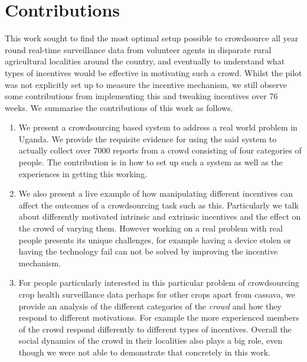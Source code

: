 \documentclass[letterpaper]{article} %
\begin{document}
\section{Contributions}
This work sought to find the most optimal setup possible to crowdsource all year round real-time surveillance data from volunteer agents in disparate rural agricultural localities around the country, and eventually to understand what types of incentives would be effective in motivating such a crowd. Whilst the pilot was not explicitly set up to measure the incentive mechanism, we still observe some contributions from implementing this and tweaking incentives over 76 weeks. We summarise the contributions of this work as follows.
\begin{enumerate}
\item We present a crowdsourcing based system to address a real world problem in Uganda. We provide the requisite evidence for using the said system to actually collect over 7000 reports from a crowd consisting of four categories of people. The contribution is in how to set up such a system as well as the experiences in getting this working.
\item We also present a live example of how manipulating different incentives can affect the outcomes of a crowdsourcing task such as this. Particularly we talk about differently motivated intrinsic and extrinsic incentives and the effect on the crowd of varying them. However working on a real problem with real people presents its unique challenges, for example having a device stolen or having the technology fail can not be solved by improving the incentive mechanism.
\item For people particularly interested in this particular problem of crowdsourcing crop health surveillance data perhaps for other crops apart from cassava, we provide an analysis of the different categories of the \emph{crowd} and how they respond to different motivations. For example the more experienced members of the crowd respond differently to different types of incentives. Overall the social dynamics of the crowd in their localities also plays a big role, even though we were not able to demonstrate that concretely in this work.
\end{enumerate}
\end{document}
